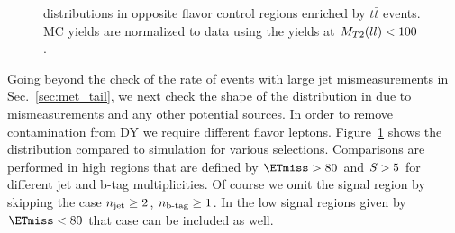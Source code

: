 \begin{figure}[!hbtp]
\caption{\mtll distributions in opposite flavor control regions enriched by $t\bar{t}$ events. MC yields are normalized to data using the yields at $M_{T2}(ll)<100$ \GeV.  }
\label{fig:ttBar_controlPlots}
\end{figure}

Going beyond the check of the rate of events with large jet mismeasurements in Sec.~\ref{sec:met_tail}, we next check the shape of the \mtll distribution in \ttbar due to \ETmiss mismeasurements and any other potential sources.
In order to remove contamination from DY we require different flavor leptons. 
Figure~\ref{fig:ttBar_controlPlots}  shows the \mtll distribution compared to simulation for various selections. Comparisons are performed in high \ETmiss regions
that are defined by $\ETmiss>80$ \GeV and $S>5$ for different jet and b-tag multiplicities. Of course we omit the signal region by skipping the case $n_\text{jet} \geq 2$, $n_\text{b-tag}\geq1$.
In the low \ETmiss signal regions given by $\ETmiss<80$ \GeV that case can be included as well. 

